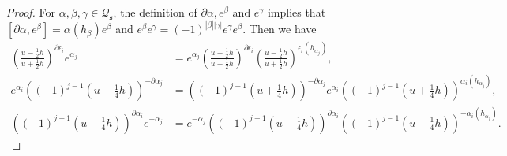 \documentclass[a4paper,12pt]{article}
\numberwithin{equation}{section}
\begin{document}
\begin{proof}
For $\alpha,\beta,\gamma \in \mathcal{Q}_{\mathfrak{s}}$, the definition of $\partial \alpha, e^{\beta}$ and $e^{\gamma}$ implies that $[\partial \alpha, e^{\beta}]=\alpha(h_{\beta})e^{\beta}$ and $e^{\beta}e^{\gamma}=(-1)^{|\beta||\gamma|}e^{\gamma}e^{\beta}$. Then we have
\begin{align*}
\left(\frac{u-\frac{1}{2}h}{u+\frac{1}{2}h}\right)^{\partial \epsilon_{i}}
e^{\alpha_{j}}&=e^{\alpha_{j}}\left(\frac{u-\frac{1}{2}h}{u+\frac{1}{2}h}\right)^{\partial \epsilon_{i}}\left(\frac{u-\frac{1}{2}h}{u+\frac{1}{2}h}\right)^{\epsilon_{i}(h_{\alpha_{j}})},\\
e^{\alpha_{i}}\left((-1)^{j-1}
\left(u+\frac{1}{4}h\right)\right)^{-\partial \alpha_{j}}&=\left((-1)^{j-1}
\left(u+\frac{1}{4}h\right)\right)^{-\partial \alpha_{j}}e^{\alpha_{i}}\left((-1)^{j-1}
\left(u+\frac{1}{4}h\right)\right)^{\alpha_{i}(h_{\alpha_{j}})},\\
\left((-1)^{j-1}
\left(u-\frac{1}{4}h\right)\right)^{\partial \alpha_{i}}e^{-\alpha_{j}}&=e^{-\alpha_{j}}\left((-1)^{j-1}
\left(u-\frac{1}{4}h\right)\right)^{\partial \alpha_{i}}\left((-1)^{j-1}
\left(u-\frac{1}{4}h\right)\right)^{-\alpha_{i}(h_{\alpha_{j}})}.
\end{align*}


\end{proof}
\end{document}
